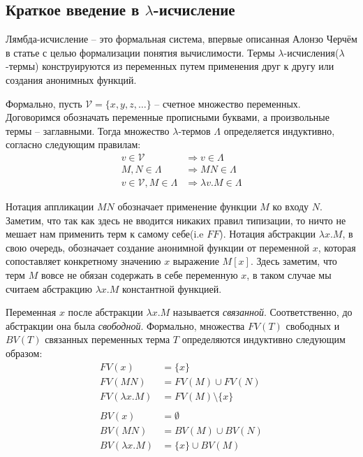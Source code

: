 \subsection{Краткое введение в \texorpdfstring{$\lambda$}{лямбда}-исчисление}

Лямбда-исчисление -- это формальная система, впервые описанная Алонзо Черчём в статье \cite{church1936unsolvable} с целью формализации понятия вычислимости. Термы $\lambda$-исчисления($\lambda$-термы) конструируются из переменных путем применения друг к другу или создания анонимных функций.

Формально, пусть $\mathcal{V}=\{x,y,z,\dots\}$ -- счетное множество переменных. Договоримся обозначать переменные прописными буквами, а произвольные термы -- заглавными. Тогда множество $\lambda$-термов $\Lambda$ определяется индуктивно, согласно следующим правилам:
\begin{align*}
  v \in \mathcal{V} &\Rightarrow v \in \Lambda \\
  M, N \in \Lambda &\Rightarrow M N \in \Lambda \\
  v \in \mathcal{V}, M \in \Lambda &\Rightarrow \lambda v.M \in \Lambda
\end{align*}

Нотация аппликации $M N$ обозначает применение функции $M$ ко входу $N$. Заметим, что так как здесь не вводится никаких правил типизации, то ничто не мешает нам применить терм к самому себе(i.e $F F$). Нотация абстракции $\lambda x.M$, в свою очередь, обозначает создание анонимной функции от переменной $x$, которая сопоставляет конкретному значению $x$ выражение $M[x]$. Здесь заметим, что терм $M$ вовсе не обязан содержать в себе переменную $x$, в таком случае мы считаем абстракцию $\lambda x.M$ константной функцией.


Переменная $x$ после абстракции $\lambda x.M$ называется \textit{связанной}. Соответственно, до абстракции она была \textit{свободной}. Формально, множества $FV(T)$ свободных и $BV(T)$ связанных переменных терма $T$ определяются индуктивно следующим образом:
\begin{align*}
  FV(x) &= \{x\} \\
  FV(M N) &= FV(M) \cup FV(N) \\
  FV(\lambda x. M) &= FV(M) \setminus \{x\} \\
  \\
  BV(x) &= \emptyset \\
  BV(M N) &= BV(M) \cup BV(N) \\
  BV(\lambda x. M) &= \{x\} \cup BV(M)
\end{align*}

